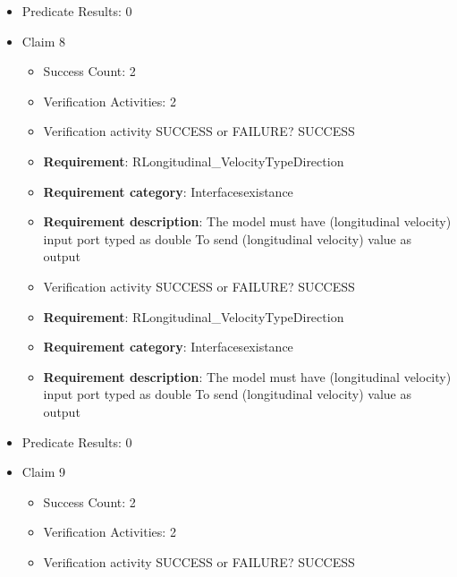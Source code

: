 \documentclass{article}
\begin{document}
\begin{itemize}
\begin{itemize}
					\item Verification activity SUCCESS or FAILURE? SUCCESS
		
						\item \textbf{Requirement}: RAccelerationTypeDirection 
						\item \textbf{Requirement category}: Interfacesexistance 
						\item \textbf{Requirement description}: The model must have (acceleration) input port typed as double To get (acceleration) value as input
					
				\end{itemize}
				
									    
				\item Predicate Results: 0

  				  \item Claim 8
				\begin{itemize}
			    	\item Success Count: 2 
			    	\item Verification Activities: 2
					\item Verification activity SUCCESS or FAILURE? SUCCESS
		
						\item \textbf{Requirement}: RLongitudinal\_VelocityTypeDirection 
						\item \textbf{Requirement category}: Interfacesexistance 
						\item \textbf{Requirement description}: The model must have (longitudinal velocity) input port typed as double To send (longitudinal velocity) value as output
					
					\item Verification activity SUCCESS or FAILURE? SUCCESS
		
						\item \textbf{Requirement}: RLongitudinal\_VelocityTypeDirection 
						\item \textbf{Requirement category}: Interfacesexistance 
						\item \textbf{Requirement description}: The model must have (longitudinal velocity) input port typed as double To send (longitudinal velocity) value as output
					
				\end{itemize}
				
									    
				\item Predicate Results: 0

  				  \item Claim 9
				\begin{itemize}
			    	\item Success Count: 2 
			    	\item Verification Activities: 2
					\item Verification activity SUCCESS or FAILURE? SUCCESS
		

\end{itemize}
\end{itemize}
\end{document}

